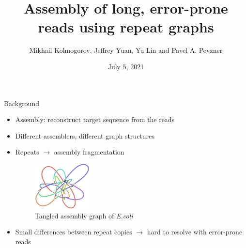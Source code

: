 \documentclass{beamer}
\title{Assembly of long, error-prone reads using repeat graphs}
\date{July 5, 2021}
\author{Mikhail Kolmogorov, Jeffrey Yuan, Yu Lin and Pavel A. Pevzner}
\institute{Presented by: Johannes Hausmann, Luis Kress}
\begin{document}
  \maketitle
  
  
  \begin{frame}{Background}
    \begin{itemize}[<+- | alert@+>]
      \item Assembly: reconstruct target sequence from the reads

      \item Different assemblers, different graph structures

      \item Repeats $\rightarrow$ assembly fragmentation
      \begin{figure}
        \includegraphics[width=3cm]{presentation/images/tangled.png}
        \caption*{Tangled assembly graph of \textit{E.coli} \cite{kolmogorov_assembly_2019}}
        \label{fig:tangled}
      \end{figure}

      \item Small differences between repeat copies $\rightarrow$ hard to
      resolve with error-prone reads

    \end{itemize}
  \end{frame}

  

\end{document}
